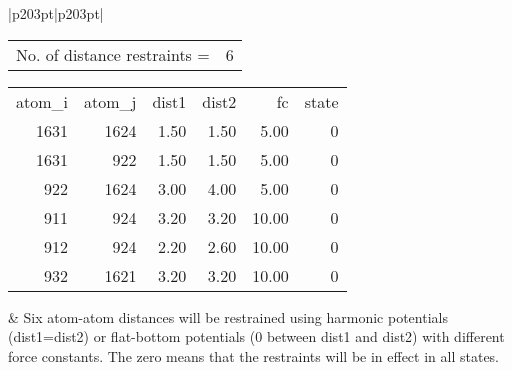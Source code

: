 \documentclass[a4paper,10pt]{article}
\begin{document}
\begin{longtable}{|p{203pt}|p{203pt}|}
\hline \begin{tabular}{ll}No. of distance restraints = & 6\end{tabular} \newline \begin{tabular}{rrrrrr}atom\_i & atom\_j & dist1 & dist2 & fc & state \\ 1631 & 1624 & 1.50 & 1.50 & 5.00 & 0 \\ 1631 & 922 & 1.50 & 1.50 & 5.00 & 0 \\ 922 & 1624 & 3.00 & 4.00 & 5.00 & 0 \\ 911 & 924 & 3.20 & 3.20 & 10.00 & 0 \\ 912 & 924 & 2.20 & 2.60 & 10.00 & 0 \\ 932 & 1621 & 3.20 & 3.20 & 10.00 & 0 \end{tabular} & Six atom-atom distances will be restrained using harmonic potentials (dist1=dist2) or flat-bottom potentials (0 between dist1 and dist2) with different force constants. The zero means that the restraints will be in effect in all states.\\
\hline
\end{longtable}
\end{document}
